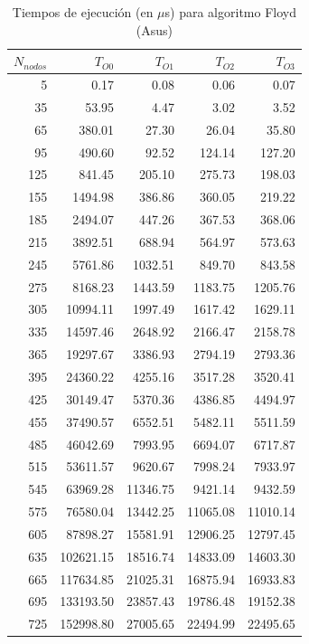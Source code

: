 \documentclass{homework}
\begin{document}
    \begin{table}[H]
        \centering
        \begin{tabular}{|r|r|r|r|r|}
            \hline
            $N_{nodos}$ & $T_{O0}$ & $T_{O1}$ & $T_{O2}$ & $T_{O3}$ \\
            \hline
            5 & 0.17 & 0.08 & 0.06 & 0.07 \\ 
            35 & 53.95 & 4.47 & 3.02 & 3.52 \\ 
            65 & 380.01 & 27.30 & 26.04 & 35.80 \\ 
            95 & 490.60 & 92.52 & 124.14 & 127.20 \\ 
            125 & 841.45 & 205.10 & 275.73 & 198.03 \\ 
            155 & 1494.98 & 386.86 & 360.05 & 219.22 \\ 
            185 & 2494.07 & 447.26 & 367.53 & 368.06 \\ 
            215 & 3892.51 & 688.94 & 564.97 & 573.63 \\ 
            245 & 5761.86 & 1032.51 & 849.70 & 843.58 \\ 
            275 & 8168.23 & 1443.59 & 1183.75 & 1205.76 \\ 
            305 & 10994.11 & 1997.49 & 1617.42 & 1629.11 \\ 
            335 & 14597.46 & 2648.92 & 2166.47 & 2158.78 \\ 
            365 & 19297.67 & 3386.93 & 2794.19 & 2793.36 \\ 
            395 & 24360.22 & 4255.16 & 3517.28 & 3520.41 \\ 
            425 & 30149.47 & 5370.36 & 4386.85 & 4494.97 \\ 
            455 & 37490.57 & 6552.51 & 5482.11 & 5511.59 \\ 
            485 & 46042.69 & 7993.95 & 6694.07 & 6717.87 \\ 
            515 & 53611.57 & 9620.67 & 7998.24 & 7933.97 \\ 
            545 & 63969.28 & 11346.75 & 9421.14 & 9432.59 \\ 
            575 & 76580.04 & 13442.25 & 11065.08 & 11010.14 \\ 
            605 & 87898.27 & 15581.91 & 12906.25 & 12797.45 \\ 
            635 & 102621.15 & 18516.74 & 14833.09 & 14603.30 \\ 
            665 & 117634.85 & 21025.31 & 16875.94 & 16933.83 \\ 
            695 & 133193.50 & 23857.43 & 19786.48 & 19152.38 \\ 
            725 & 152998.80 & 27005.65 & 22494.99 & 22495.65 \\ 
            \hline
        \end{tabular}
        \caption{Tiempos de ejecución (en $\mu$s) para algoritmo Floyd (Asus)}
    \end{table}
\end{document}
